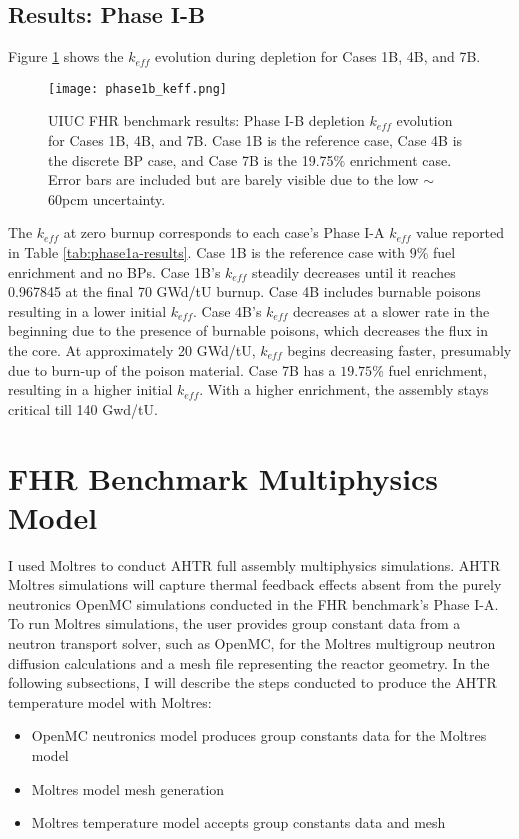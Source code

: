 \subsection{Results: Phase I-B}
Figure \ref{fig:phase1b_keff} shows the $k_{eff}$ evolution during depletion 
for Cases 1B, 4B, and 7B.
\begin{figure}[htbp]
    \centering
    \texttt{[image: phase1b\_keff.png]} 
    \caption{\gls{UIUC} \gls{FHR} benchmark results: Phase I-B depletion 
    $k_{eff}$ evolution for Cases 1B, 4B, and 7B. Case 1B is the reference case, 
    Case 4B is the discrete \acrlong{BP} case, and Case 7B is the 19.75$\%$ 
    enrichment case. Error bars are included but are barely visible due to the 
    low $\sim$60pcm uncertainty.}
    \label{fig:phase1b_keff}
\end{figure}
The $k_{eff}$ at zero burnup corresponds to each case's Phase I-A $k_{eff}$ value 
reported in Table \ref{tab:phase1a-results}. 
Case 1B is the reference case with $9\%$ fuel enrichment and no \glspl{BP}. 
Case 1B's $k_{eff}$ steadily decreases until it reaches 0.967845 at the final 70 
GWd/tU burnup. 
Case 4B includes burnable poisons resulting in a lower initial $k_{eff}$. 
Case 4B's $k_{eff}$ decreases at a slower rate in the beginning due to the presence of 
burnable poisons, which decreases the flux in the core. 
At approximately 20 GWd/tU, $k_{eff}$ begins decreasing faster, presumably
due to burn-up of the poison material.   
Case 7B has a $19.75\%$ fuel enrichment, resulting in a higher initial $k_{eff}$. 
With a higher enrichment, the assembly stays critical till 140 Gwd/tU. 

\section{FHR Benchmark Multiphysics Model}
I used Moltres \cite{lindsay_moltres_2017} to conduct \gls{AHTR} full assembly multiphysics 
simulations. 
AHTR Moltres simulations will capture thermal feedback effects absent from the purely 
neutronics OpenMC simulations conducted in the \gls{FHR} benchmark's Phase I-A.
To run Moltres simulations, the user provides group constant data from a neutron transport 
solver, such as OpenMC, for the Moltres multigroup neutron diffusion calculations and
a mesh file representing the reactor geometry. 
In the following subsections, I will describe the steps conducted to produce the 
\gls{AHTR} temperature model with Moltres:
\begin{itemize}
    \item OpenMC neutronics model produces group constants data for the Moltres model
    \item Moltres model mesh generation
    \item Moltres temperature model accepts group constants data and mesh
\end{itemize}

